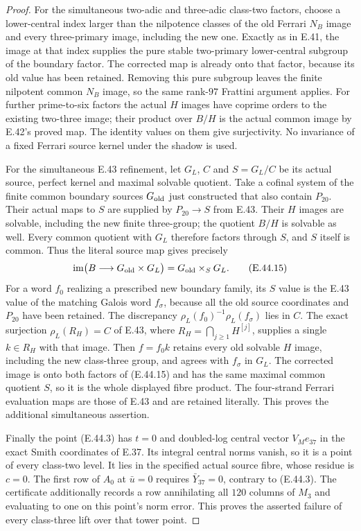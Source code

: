 \begin{proof}
For the simultaneous two-adic and three-adic
class-two factors, choose a lower-central index
larger than the nilpotence classes of the old
Ferrari $N_B$ image and every three-primary
image, including the new one.  Exactly as in
E.41, the image at that index supplies the pure
stable two-primary lower-central subgroup of
the boundary factor.  The corrected map is
already onto that factor, because its old value
has been retained.  Removing this pure subgroup
leaves the finite nilpotent common $N_B$ image,
so the same rank-$97$ Frattini argument applies.
For further prime-to-six factors the actual $H$
images have coprime orders to the existing
two-three image; their product over $B/H$ is
the actual common image by E.42's proved map.
The identity values on them give surjectivity.
No invariance of a fixed Ferrari source kernel
under the shadow is used.

For the simultaneous E.43 refinement, let $G_L$, $C$
and $S=G_L/C$ be its actual source, perfect kernel
and maximal solvable quotient.  Take a cofinal system
of the finite common boundary sources $G_{\rm old}$
just constructed that also contain $P_{20}$.
Their actual maps to $S$ are supplied by
$P_{20}\to S$ from E.43.  Their $H$ images are
solvable, including the new finite three-group;
the quotient $B/H$ is solvable as well.
Every common quotient with $G_L$ therefore factors
through $S$, and $S$ itself is common.  Thus the
literal source map gives precisely
\[
 \operatorname{im}\bigl(B\longrightarrow
          G_{\rm old}\times G_L\bigr)
       =G_{\rm old}\times_S G_L .
 \tag{E.44.15}
\]
For a word $f_0$ realizing a prescribed new boundary
family, its $S$ value is the E.43 value of the matching
Galois word $f_\sigma$, because all the old source
coordinates and $P_{20}$ have been retained.
The discrepancy
$\rho_L(f_0)^{-1}\rho_L(f_\sigma)$ lies in $C$.
The exact surjection
$\rho_L(R_H)=C$ of E.43, where
$R_H=\bigcap_{j\ge1}H^{[j]}$, supplies a single
$k\in R_H$ with that image.  Then $f=f_0k$
retains every old solvable $H$ image, including
the new class-three group, and agrees with
$f_\sigma$ in $G_L$.
The corrected image is onto both factors of
\textup{(E.44.15)} and has the same maximal common
quotient $S$, so it is the whole displayed fibre
product.  The four-strand Ferrari evaluation maps
are those of E.43 and are retained literally.
This proves the additional simultaneous assertion.

Finally the point \textup{(E.44.3)} has $t=0$
and doubled-log central vector $V_Me_{37}$ in
the exact Smith coordinates of E.37.
Its integral central norms vanish, so it is a
point of every class-two level.  It lies in the
specified actual source fibre, whose residue is
$c=0$.  The first row of $A_0$ at $\bar u=0$
requires $\bar Y_{37}=0$, contrary to
\textup{(E.44.3)}.
The certificate additionally records a row
annihilating all $120$ columns of $M_3$ and
evaluating to one on this point's norm error.
This proves the asserted failure of every
class-three lift over that tower point.


\end{proof}
